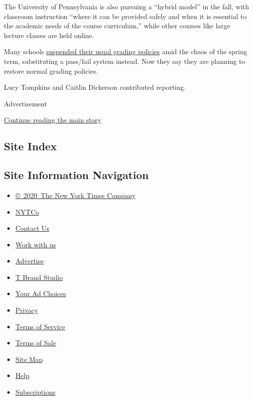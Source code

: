 The University of Pennsylvania is also pursuing a ``hybrid model'' in
the fall, with classroom instruction ``where it can be provided safely
and when it is essential to the academic needs of the course
curriculum,'' while other courses like large lecture classes are held
online.

Many schools
\href{https://www.nytimes.com/2020/03/28/us/coronavirus-college-pass-fail.html}{suspended
their usual grading policies} amid the chaos of the spring term,
substituting a pass/fail system instead. Now they say they are planning
to restore normal grading policies.

Lucy Tompkins and Caitlin Dickerson contributed reporting.

Advertisement

\protect\hyperlink{after-bottom}{Continue reading the main story}

\hypertarget{site-index}{%
\subsection{Site Index}\label{site-index}}

\hypertarget{site-information-navigation}{%
\subsection{Site Information
Navigation}\label{site-information-navigation}}

\begin{itemize}
\tightlist
\item
  \href{https://help.nytimes.com/hc/en-us/articles/115014792127-Copyright-notice}{©~2020~The
  New York Times Company}
\end{itemize}

\begin{itemize}
\tightlist
\item
  \href{https://www.nytco.com/}{NYTCo}
\item
  \href{https://help.nytimes.com/hc/en-us/articles/115015385887-Contact-Us}{Contact
  Us}
\item
  \href{https://www.nytco.com/careers/}{Work with us}
\item
  \href{https://nytmediakit.com/}{Advertise}
\item
  \href{http://www.tbrandstudio.com/}{T Brand Studio}
\item
  \href{https://www.nytimes.com/privacy/cookie-policy\#how-do-i-manage-trackers}{Your
  Ad Choices}
\item
  \href{https://www.nytimes.com/privacy}{Privacy}
\item
  \href{https://help.nytimes.com/hc/en-us/articles/115014893428-Terms-of-service}{Terms
  of Service}
\item
  \href{https://help.nytimes.com/hc/en-us/articles/115014893968-Terms-of-sale}{Terms
  of Sale}
\item
  \href{https://spiderbites.nytimes.com}{Site Map}
\item
  \href{https://help.nytimes.com/hc/en-us}{Help}
\item
  \href{https://www.nytimes.com/subscription?campaignId=37WXW}{Subscriptions}
\end{itemize}
